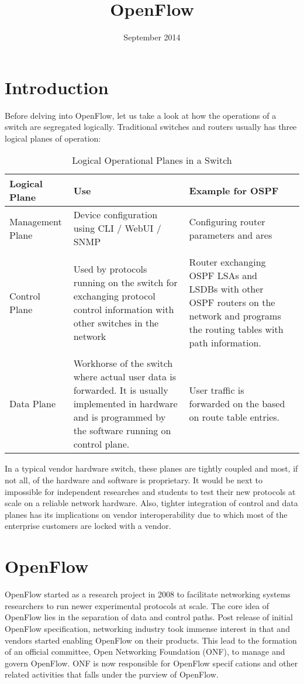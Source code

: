 \documentclass[a4paper]{article}
\title{\vspace{-4ex}\textbf{OpenFlow}\vspace{-5ex}}
\date{September 2014}
\begin{document}
\maketitle

\section{Introduction}
Before delving into OpenFlow, let us take a look at how the operations of a switch are segregated logically. Traditional switches and routers usually has three logical planes of operation:  

\begin{table}[h!]
\centering
\begin{center}
\begin{tabular}{|l|p{6cm}|p{6cm}|}
\hline
\textbf{Logical Plane} & \textbf{Use} & \textbf{Example for OSPF} \\ \hline
Management Plane & 
Device configuration using CLI / WebUI / SNMP & 
Configuring router parameters and ares \\
&  & \\
Control Plane & 
Used by protocols running on the switch for exchanging protocol control information with other switches in the network & 
Router exchanging OSPF LSAs and LSDBs with other OSPF routers on the network and programs the routing tables with path information. \\
&  & \\
Data Plane &
Workhorse of the switch where actual user data is forwarded. It is usually implemented in hardware and is programmed by the software running on control plane.  &
User traffic is forwarded on the based on route table entries.  &
\hline
\end{tabular}
\caption{Logical Operational Planes in a Switch}
\label{table:1}
\end{center}
\end{table}

In a typical vendor hardware switch, these planes are tightly coupled and most, if not all, of the hardware and software is proprietary. It would be next to impossible for independent researches and students to test their new protocols at scale on a reliable network hardware. Also, tighter integration of control and data planes has its implications on vendor interoperability due to which most of the enterprise customers are locked with a vendor.

\section{OpenFlow}
OpenFlow started as a research project\cite{key:of_wp} in 2008 to facilitate networking systems researchers to run newer experimental protocols at scale. The core idea of OpenFlow lies in the separation of data and control paths. Post release of initial OpenFlow specification, networking industry took immense interest in that and vendors started enabling OpenFlow on their products. This lead to the formation of an official committee, Open Networking Foundation (ONF)\cite{onf}, to manage and govern OpenFlow. ONF is now responsible for OpenFlow specif cations and other related activities that falls under the purview of OpenFlow.
\end{document}

